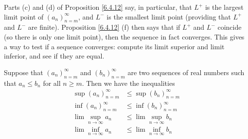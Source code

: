 \begin{note}
    Parts (c) and (d) of Proposition \ref{6.4.12} say, in particular, that \(L^+\) is the largest limit point of \((a_n)_{n = m}^\infty\), and \(L^-\) is the smallest limit point
    (providing that \(L^+\) and \(L^-\) are finite).
    Proposition \ref{6.4.12} (f) then says that if \(L^+\) and \(L^-\) coincide (so there is only one limit point), then the sequence in fact converges.
    This gives a way to test if a sequence converges: compute its limit superior and limit inferior, and see if they are equal.
\end{note}

\begin{lemma}\label{6.4.13}
    Suppose that \((a_n)_{n = m}^\infty\) and \((b_n)_{n = m}^\infty\) are two sequences of real numbers such that \(a_n \leq b_n\) for all \(n \geq m\).
    Then we have the inequalities
    \begin{align*}
        \sup(a_n)_{n = m}^\infty    & \leq \sup(b_n)_{n = m}^\infty    \\
        \inf(a_n)_{n = m}^\infty    & \leq \inf(b_n)_{n = m}^\infty    \\
        \lim\sup_{n \to \infty} a_n & \leq \lim\sup_{n \to \infty} b_n \\
        \lim\inf_{n \to \infty} a_n & \leq \lim\inf_{n \to \infty} b_n
    \end{align*}
\end{lemma}

